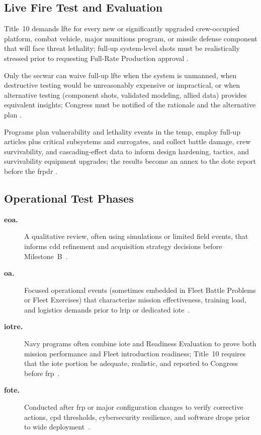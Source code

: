 \documentclass[../main.tex]{subfiles}
\begin{document}
\subsection{Live Fire Test and Evaluation}
\begin{description}[style=nextline,labelsep=0.5em,font=\bfseries]
  \item[\textbf{When required.}] Title~10 demands \ac{lfte} for every new or significantly upgraded crew-occupied platform, combat vehicle, major munitions program, or missile defense component that will face threat lethality; full-up system-level shots must be realistically stressed prior to requesting Full-Rate Production approval \autocite{USC-10-2366,DoDI5000-89}.
  \item[\textbf{When waived.}] Only the \ac{secwar} can waive full-up \ac{lfte} when the system is unmanned, when destructive testing would be unreasonably expensive or impractical, or when alternative testing (component shots, validated modeling, allied data) provides equivalent insights; Congress must be notified of the rationale and the alternative plan \autocite{USC-10-2366,DoDI5000-89}.
  \item[\textbf{Execution and use.}] Programs plan vulnerability and lethality events in the \ac{temp}, employ full-up articles plus critical subsystems and surrogates, and collect battle damage, crew survivability, and cascading-effect data to inform design hardening, tactics, and survivability equipment upgrades; the results become an annex to the \ac{dote} report before the \ac{frpdr} \autocite{DoDI5000-89,DoDI5000-85}.
\end{description}

\subsection{Operational Test Phases}
\begin{description}
  \item[\textbf{\ac{eoa}.}] A qualitative review, often using simulations or limited field events, that informs \ac{cdd} refinement and acquisition strategy decisions before Milestone~B~\autocite{edo-3-5-6-test-eval-part-ii-2025}.
  \item[\textbf{\ac{oa}.}] Focused operational events (sometimes embedded in Fleet Battle Problems or Fleet Exercises) that characterize mission effectiveness, training load, and logistics demands prior to \ac{lrip} or dedicated \ac{iote}~\autocite{edo-3-5-6-test-eval-part-ii-2025}.
  \item[\textbf{\ac{iotre}.}] Navy programs often combine \ac{iote} and Readiness Evaluation to prove both mission performance and Fleet introduction readiness; Title~10 requires that the \ac{iote} portion be adequate, realistic, and reported to Congress before \ac{frp}~\autocite{USC-10-2399}.
  \item[\textbf{\ac{fote}.}] Conducted after \ac{frp} or major configuration changes to verify corrective actions, \ac{cpd} thresholds, cybersecurity resilience, and software drops prior to wide deployment~\autocite{DoDI5000-89}.
\end{description}
\end{document}
